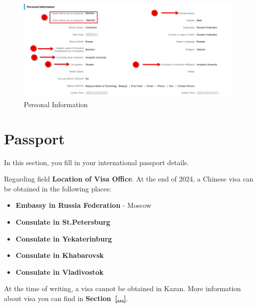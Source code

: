 \begin{figure}[H]
    \centering
    \includegraphics[width=\textwidth]{russia/imgs/app_4_personal_info}
    \caption{\centering Personal Information}
    \label{fig:ru_pers_info}
\end{figure}









\section{Passport}\label{sec:ru_passport}

In this section, you fill in your international passport details.

Regarding field \textbf{Location of Visa Office}.
At the end of 2024, a Chinese visa can be obtained in the following places:

\begin{itemize}
    \item \textbf{Embassy in Russia Federation} - Moscow
    \item \textbf{Consulate in St.Petersburg}
    \item \textbf{Consulate in Yekaterinburg}
    \item \textbf{Consulate in Khabarovsk}
    \item \textbf{Consulate in Vladivostok}
\end{itemize}


\begin{note}
    At the time of writing, a visa cannot be obtained in Kazan.
    More information about visa you can find in \textbf{Section~\ref{...}}.
\end{note}









